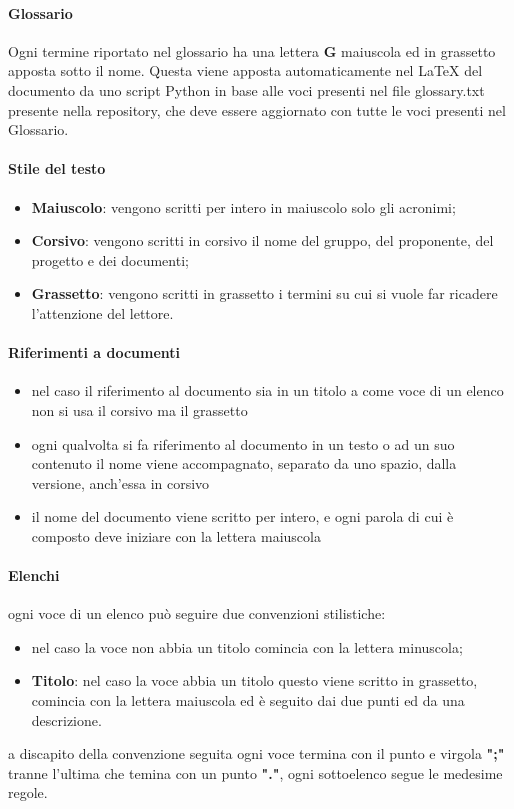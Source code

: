 	    \paragraph{Glossario}
	    Ogni termine riportato nel glossario ha una lettera \textbf{G} maiuscola ed in grassetto apposta sotto il nome. Questa viene apposta automaticamente nel LaTeX del documento da uno script Python in base alle voci presenti nel file glossary.txt presente nella repository, che deve essere aggiornato con tutte le voci presenti nel Glossario.
	    \paragraph{Stile del testo}
	    \begin{itemize}
	        \item \textbf{Maiuscolo}: vengono scritti per intero in maiuscolo solo gli acronimi;
	        \item \textbf{Corsivo}: vengono scritti in corsivo il nome del gruppo, del proponente, del progetto e dei documenti;
	        \item \textbf{Grassetto}: vengono scritti in grassetto i termini su cui si vuole far ricadere l'attenzione del lettore.
	    \end{itemize}
	    \paragraph{Riferimenti a documenti}
	    \begin{itemize}
	        \item nel caso il riferimento al documento sia in un titolo a come voce di un elenco non si usa il corsivo ma il grassetto
	        \item ogni qualvolta si fa riferimento al documento in un testo o ad un suo contenuto il nome viene accompagnato, separato da uno spazio, dalla versione, anch'essa in corsivo
	        \item il nome del documento viene scritto per intero, e ogni parola di cui è composto deve iniziare con la lettera maiuscola
	    \end{itemize}
	    \paragraph{Elenchi}
	    ogni voce di un elenco può seguire due convenzioni stilistiche:
	    \begin{itemize}
	        \item nel caso la voce non abbia un titolo comincia con la lettera minuscola;
	        \item \textbf{Titolo}: nel caso la voce abbia un titolo questo viene scritto in grassetto, comincia con la lettera maiuscola ed è seguito dai due punti ed da una descrizione.
	    \end{itemize}
	    a discapito della convenzione seguita ogni voce termina con il punto e virgola \textbf{";"} tranne l'ultima che temina con un punto \textbf{"."}, ogni sottoelenco segue le medesime regole.
